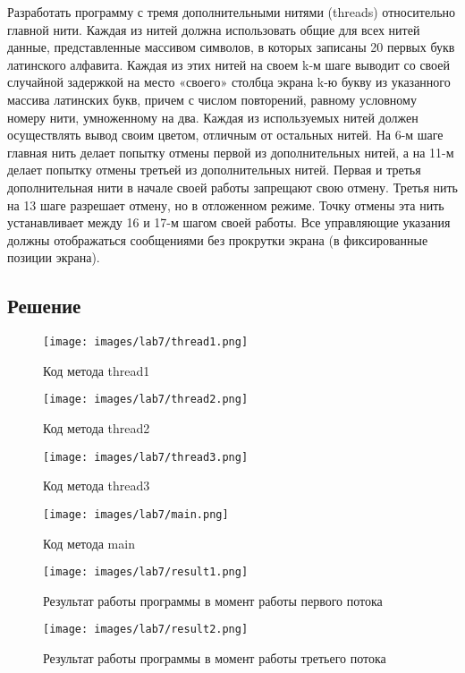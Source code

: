 \documentclass[14pt, a4paper]{article}
\begin{document}
    Разработать программу с тремя дополнительными нитями (threads) относительно главной нити. Каждая из нитей должна использовать общие для всех нитей данные, представленные массивом символов, в которых записаны 20 первых букв латинского алфавита. Каждая из этих нитей на своем k-м шаге выводит со своей случайной задержкой на место «своего» столбца экрана k-ю букву из указанного массива латинских букв, причем с числом повторений, равному условному номеру нити, умноженному на два. Каждая из используемых нитей должен осуществлять вывод своим цветом, отличным от остальных нитей. На 6-м шаге главная нить делает попытку отмены первой из дополнительных нитей, а на 11-м делает попытку отмены третьей из дополнительных нитей. Первая и третья дополнительная нити в начале своей работы запрещают свою отмену. Третья нить на 13 шаге разрешает отмену, но в отложенном режиме. Точку отмены эта нить устанавливает между 16 и 17-м шагом своей работы. Все управляющие указания должны отображаться сообщениями без прокрутки экрана (в фиксированные позиции экрана).

    \subsection*{Решение}

    \begin{figure}[H]
        \centering
        \texttt{[image: images/lab7/thread1.png]}
        \caption{Код метода thread1}
    \end{figure}

    \begin{figure}[H]
        \centering
        \texttt{[image: images/lab7/thread2.png]}
        \caption{Код метода thread2}
    \end{figure}

    \begin{figure}[H]
        \centering
        \texttt{[image: images/lab7/thread3.png]}
        \caption{Код метода thread3}
    \end{figure}

    \begin{figure}[H]
        \centering
        \texttt{[image: images/lab7/main.png]}
        \caption{Код метода main}
    \end{figure}

    \begin{figure}[H]
        \centering
        \texttt{[image: images/lab7/result1.png]}
        \caption{Результат работы программы в момент работы первого потока}
    \end{figure}

    \begin{figure}[H]
        \centering
        \texttt{[image: images/lab7/result2.png]}
        \caption{Результат работы программы в момент работы третьего потока}
    \end{figure}

    \newpage
    
\end{document}
